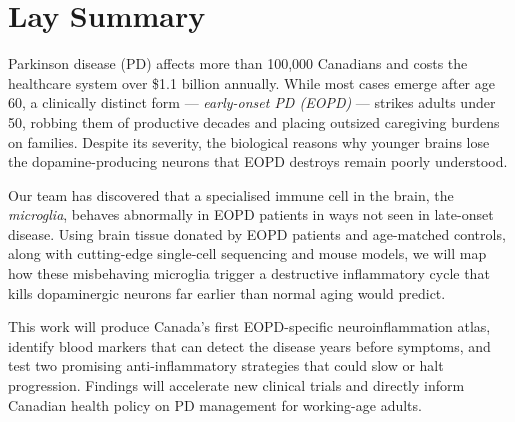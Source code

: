 \section{Lay Summary}

Parkinson disease (PD) affects more than 100,000 Canadians and costs the healthcare system over \$1.1 billion annually. While most cases emerge after age 60, a clinically distinct form --- \textit{early-onset PD (EOPD)} --- strikes adults under 50, robbing them of productive decades and placing outsized caregiving burdens on families. Despite its severity, the biological reasons why younger brains lose the dopamine-producing neurons that EOPD destroys remain poorly understood.

Our team has discovered that a specialised immune cell in the brain, the \textit{microglia}, behaves abnormally in EOPD patients in ways not seen in late-onset disease. Using brain tissue donated by EOPD patients and age-matched controls, along with cutting-edge single-cell sequencing and mouse models, we will map how these misbehaving microglia trigger a destructive inflammatory cycle that kills dopaminergic neurons far earlier than normal aging would predict.

This work will produce Canada's first EOPD-specific neuroinflammation atlas, identify blood markers that can detect the disease years before symptoms, and test two promising anti-inflammatory strategies that could slow or halt progression. Findings will accelerate new clinical trials and directly inform Canadian health policy on PD management for working-age adults.

